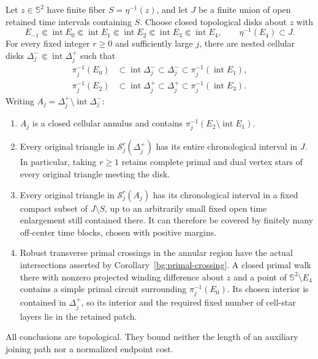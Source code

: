 \begin{proposition}
Let $z\in\mathbb S^2$ have finite fiber $S=\eta^{-1}(z)$, and let $J$
be a finite union of open retained time intervals containing $S$.
Choose closed topological disks about $z$ with
\[
 E_{-1}\Subset\operatorname{int}E_0\Subset\operatorname{int}E_1
 \Subset\operatorname{int}E_2\Subset\operatorname{int}E_3
 \Subset\operatorname{int}E_4,
 \qquad \eta^{-1}(E_4)\subset J.
\]
For every fixed integer $r\ge0$ and sufficiently large $j$, there
are nested cellular disks $\Delta_j^-\Subset\operatorname{int}\Delta_j^+$
such that
\begin{align*}
 \pi_j^{-1}(E_0)&\subset\operatorname{int}\Delta_j^-
       \subset\Delta_j^-\subset\pi_j^{-1}(\operatorname{int}E_1),\\
 \pi_j^{-1}(E_2)&\subset\operatorname{int}\Delta_j^+
       \subset\Delta_j^+\subset\pi_j^{-1}(\operatorname{int}E_3).
\end{align*}
Writing $A_j=\Delta_j^+\setminus\operatorname{int}\Delta_j^-$:
\begin{enumerate}[label=(\roman*)]
\item $A_j$ is a closed cellular annulus and contains
$\pi_j^{-1}(E_2\setminus\operatorname{int}E_1)$.
\item Every original triangle in $\mathcal S_j^r(\Delta_j^+)$ has
its entire chronological interval in $J$. In particular, taking
$r\ge1$ retains complete primal and dual vertex stars of every
original triangle meeting the disk.
\item Every original triangle in $\mathcal S_j^r(A_j)$ has its
chronological interval in a fixed compact subset of $J\setminus S$,
up to an arbitrarily small fixed open time enlargement still contained
there. It can therefore be covered by finitely many off-center time
blocks, chosen with positive margins.
\item Robust transverse primal crossings in the annular region have
the actual intersections asserted by Corollary~\ref{bg:primal-crossing}.
A closed primal walk there with nonzero projected winding difference
about $z$ and a point of $\mathbb S^2\setminus E_4$ contains a simple
primal circuit surrounding $\pi_j^{-1}(E_0)$. Its chosen interior
is contained in $\Delta_j^+$,
so its interior and the required fixed number of cell-star layers
lie in the retained patch.
\end{enumerate}
All conclusions are topological. They bound neither the length of an
auxiliary joining path nor a normalized endpoint cost.
\end{proposition}

